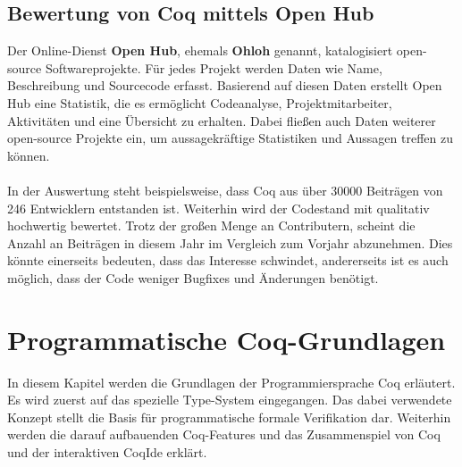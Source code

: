 \subsection{Bewertung von Coq mittels Open Hub}
Der Online-Dienst \textbf{Open Hub}, ehemals \textbf{Ohloh} genannt, katalogisiert open-source Softwareprojekte. Für jedes Projekt werden Daten wie Name, Beschreibung und Sourcecode erfasst. Basierend auf diesen Daten erstellt Open Hub eine Statistik, die es ermöglicht Codeanalyse, Projektmitarbeiter, Aktivitäten und eine Übersicht zu erhalten. Dabei fließen auch Daten weiterer open-source Projekte ein, um aussagekräftige Statistiken und Aussagen treffen zu können.\\
\\
{In der Auswertung steht beispielsweise, dass Coq aus über 30000 Beiträgen von 246 Entwicklern entstanden ist. Weiterhin wird der Codestand mit qualitativ hochwertig bewertet. Trotz der großen Menge an Contributern, scheint die Anzahl an Beiträgen in diesem Jahr im Vergleich zum Vorjahr abzunehmen. Dies könnte einerseits bedeuten, dass das Interesse schwindet, andererseits ist es auch möglich, dass der Code weniger Bugfixes und Änderungen benötigt.}\cite{OH01:FV}\\

\section{Programmatische Coq-Grundlagen}
In diesem Kapitel werden die Grundlagen der Programmiersprache Coq erläutert. Es wird zuerst auf das spezielle Type-System eingegangen. Das dabei verwendete Konzept stellt die Basis für programmatische formale Verifikation dar. Weiterhin werden die darauf aufbauenden Coq-Features und das Zusammenspiel von Coq und der interaktiven CoqIde erklärt.\\

